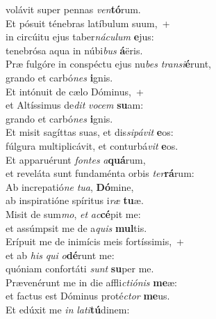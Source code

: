 \evenverse volávit super pennas \textit{ven}\textbf{tó}rum.\\
\oddverse Et pósuit ténebras latíbulum suum,~+\\
\oddverse  in circúitu ejus taber\textit{ná}\textit{cu}\textit{lum} \textbf{e}jus:~\*\\
\oddverse tenebrósa aqua in núbi\textit{bus} \textbf{á}ëris.\\
\evenverse Præ fulgóre in conspéctu ejus nu\textit{bes} \textit{tran}\textit{si}\textbf{é}runt,~\*\\
\evenverse grando et carbó\textit{nes} \textbf{i}gnis.\\
\oddverse Et intónuit de cælo Dóminus,~+\\
\oddverse  et Altíssimus de\textit{dit} \textit{vo}\textit{cem} \textbf{su}am:~\*\\
\oddverse grando et carbó\textit{nes} \textbf{i}gnis.\\
\evenverse Et misit sagíttas suas, et dis\textit{si}\textit{pá}\textit{vit} \textbf{e}os:~\*\\
\evenverse fúlgura multiplicávit, et conturbá\textit{vit} \textbf{e}os.\\
\oddverse Et apparuérunt \textit{fon}\textit{tes} \textit{a}\textbf{quá}rum,~\*\\
\oddverse et reveláta sunt fundaménta orbis \textit{ter}\textbf{rá}rum:\\
\evenverse Ab increpatió\textit{ne} \textit{tu}\textit{a}, \textbf{Dó}mine,~\*\\
\evenverse ab inspiratióne spíritus i\textit{ræ} \textbf{tu}æ.\\
\oddverse Misit de sum\textit{mo}, \textit{et} \textit{ac}\textbf{cé}pit me:~\*\\
\oddverse et assúmpsit me de a\textit{quis} \textbf{mul}tis.\\
\evenverse Erípuit me de inimícis meis fortíssimis,~+\\
\evenverse  et ab \textit{his} \textit{qui} \textit{o}\textbf{dé}runt me:~\*\\
\evenverse quóniam confortáti \textit{sunt} \textbf{su}per me.\\
\oddverse Prævenérunt me in die affli\textit{cti}\textit{ó}\textit{nis} \textbf{me}æ:~\*\\
\oddverse et factus est Dóminus proté\textit{ctor} \textbf{me}us.\\
\evenverse Et edúxit me \textit{in} \textit{la}\textit{ti}\textbf{tú}dinem:~\*\\
